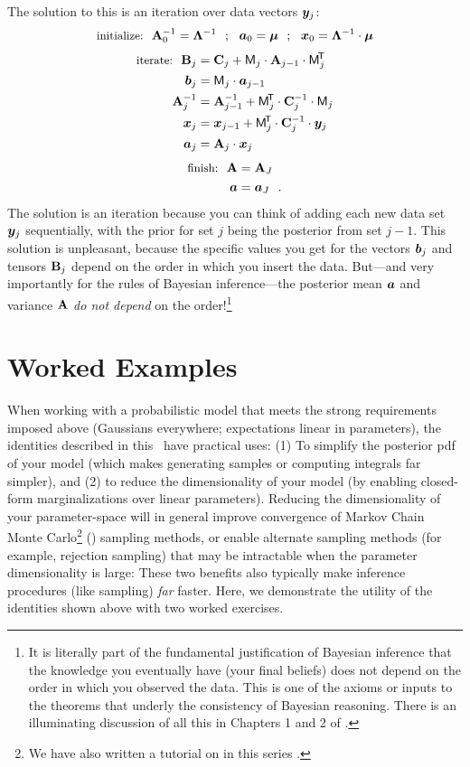 The solution to this is an iteration over data vectors $\boldsymbol{y}_j$:
\begin{equation}
  \mbox{\small initialize:}~~
  \mathbf{A}_0^{-1} = \mathbf{\Lambda}^{-1} ~~;~~ \boldsymbol{a}_0 = \boldsymbol{\mu} ~~;~~ \boldsymbol{x}_0 = \mathbf{\Lambda}^{-1}\cdot\boldsymbol{\mu}
\end{equation}
\begin{align}
  \mbox{\small iterate:}~~
  \mathbf{B}_j &= \mathbf{C}_j + \mathsf{M}_j \cdot \mathbf{A}_{j-1} \cdot \mathsf{M}_j^{\!\mathsf{T}\!} \\
  \boldsymbol{b}_j &= \mathsf{M}_j \cdot \boldsymbol{a}_{j-1} \\
  \mathbf{A}_j^{-1} &= \mathbf{A}_{j-1}^{-1} + \mathsf{M}_j^{\!\mathsf{T}\!} \cdot \mathbf{C}_j^{-1} \cdot \mathsf{M}_j \\
  \boldsymbol{x}_j &= \boldsymbol{x}_{j-1} + \mathsf{M}_j^{\!\mathsf{T}\!} \cdot \mathbf{C}_j^{-1} \cdot \boldsymbol{y}_j \\
  \boldsymbol{a}_j &= \mathbf{A}_j \cdot \boldsymbol{x}_j
\end{align}
\begin{align}
  \mbox{\small finish:}~~
  \mathbf{A} &= \mathbf{A}_J \\
  \boldsymbol{a} &= \boldsymbol{a}_J
  ~~.
\end{align}
The solution is an iteration because you can think of adding each new data
set $\boldsymbol{y}_j$ sequentially, with the prior for set $j$ being the posterior from
set $j-1$.
This solution is unpleasant, because the specific values you get for the
vectors $\boldsymbol{b}_j$ and tensors $\mathbf{B}_j$ depend on the order in which you insert the data.
But---and very importantly for the rules of Bayesian inference---the posterior
mean $\boldsymbol{a}$ and variance $\mathbf{A}$ \emph{do not depend} on the order!\footnote{It
  is literally part of the fundamental justification of Bayesian inference
  that the knowledge you eventually have (your final beliefs) does not depend
  on the order in which you observed the data. This is one of the axioms or inputs
  to the theorems that underly the consistency of Bayesian reasoning.
  There is an illuminating discussion of all this in Chapters 1 and 2 of \cite{jaynes}.}


\section{Worked Examples}\label{sec:examples}

When working with a probabilistic model that meets the strong requirements
imposed above (Gaussians everywhere; expectations linear in parameters),
the identities described in this
\documentname\ have practical uses: (1) To simplify the posterior pdf of your
model (which makes generating samples or computing integrals far simpler), and
(2) to reduce the dimensionality of your model (by enabling closed-form
marginalizations over linear parameters).
Reducing the dimensionality of your parameter-space will in general improve
convergence of Markov Chain Monte Carlo\footnote{We have also written a tutorial
on  in this series \citep{Hogg:2018}.} () sampling
methods, or enable alternate sampling methods (for example, rejection sampling)
that may be intractable when the parameter dimensionality is large: These two
benefits also typically make inference procedures (like sampling) \emph{far}
faster.
Here, we demonstrate the utility of the identities shown above with two
worked exercises.


